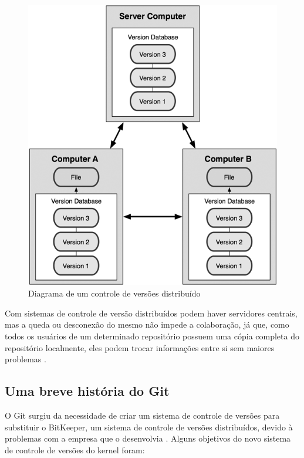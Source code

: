 \begin{figure} [ht]
	\centering
	\includegraphics[scale=0.4]{dist_version_control.png}
	\caption{Diagrama de um controle de versões distribuído \cite[p. 4]{progit}}
	\label{dist_version_control}
\end{figure}

Com sistemas de controle de versão distribuídos podem haver servidores centrais, mas a queda ou desconexão do mesmo não impede a colaboração, já que, como todos os usuários de um determinado repositório possuem uma cópia completa do repositório localmente, eles podem trocar informações entre si sem maiores problemas \cite[p. 4]{progit}.

\subsection{Uma breve história do Git}

O Git surgiu da necessidade de criar um sistema de controle de versões para substituir o BitKeeper, um sistema de controle de versões distribuídos, devido à problemas com a empresa que o desenvolvia \cite[p. 5]{progit}. Alguns objetivos do novo sistema de controle de versões do kernel foram:

